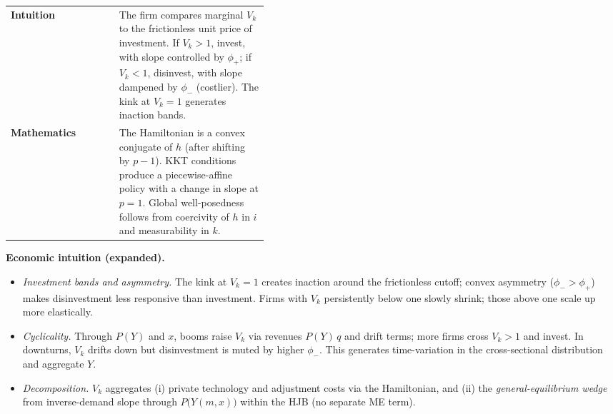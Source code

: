﻿\documentclass[11pt,letterpaper,oneside]{article}
\numberwithin{equation}{section}
\newcommand{\1}{\mathbf{1}}
\begin{document}
\begin{tcolorbox}[didacticstyle]
\sloppy\footnotesize
\begin{tabularx}{\linewidth}{@{} >{\raggedright\arraybackslash}p{0.42\linewidth} >{\raggedright\arraybackslash}X @{} }
\textbf{Intuition} & The firm compares marginal $V_k$ to the frictionless unit price of investment. If $V_k>1$, invest, with slope controlled by $\phi_+$; if $V_k<1$, disinvest, with slope dampened by $\phi_-$ (costlier). The kink at $V_k=1$ generates inaction bands.\\
\textbf{Mathematics} & The Hamiltonian is a convex conjugate of $h$ (after shifting by $p-1$). KKT conditions produce a piecewise-affine policy with a change in slope at $p=1$. Global well-posedness follows from coercivity of $h$ in $i$ and measurability in $k$.
\end{tabularx}
\end{tcolorbox}

\begin{tcolorbox}[didacticstyle]
\textbf{Economic intuition (expanded).}
\begin{itemize}[leftmargin=1.15em,itemsep=0.25em]
  \item \emph{Investment bands and asymmetry.} The kink at $V_k=1$ creates inaction around the frictionless cutoff; convex asymmetry ($\phi_->\phi_+$) makes disinvestment less responsive than investment. Firms with $V_k$ persistently below one slowly shrink; those above one scale up more elastically.
  \item \emph{Cyclicality.} Through $P(Y)$ and $x$, booms raise $V_k$ via revenues $P(Y)\,q$ and drift terms; more firms cross $V_k>1$ and invest. In downturns, $V_k$ drifts down but disinvestment is muted by higher $\phi_-$. This generates time-variation in the cross-sectional distribution and aggregate $Y$.
  \item \emph{Decomposition.} $V_k$ aggregates (i) private technology and adjustment costs via the Hamiltonian, and (ii) the \emph{general-equilibrium wedge} from inverse-demand slope through $P\big(Y(m,x)\big)$ within the HJB (no separate ME term).
\end{itemize}
\end{tcolorbox}
\end{document}
